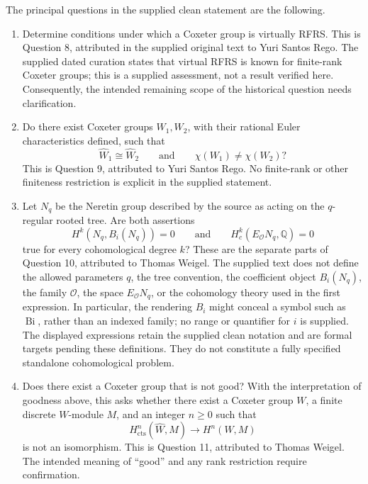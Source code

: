 \documentclass[11pt]{article}
\newcommand{\Q}{\mathbb{Q}}
\begin{document}
The principal questions in the supplied clean statement are the following.
\begin{enumerate}
\item Determine conditions under which a Coxeter group is virtually RFRS. This is Question 8, attributed in the supplied original text to Yuri Santos Rego. The supplied dated curation states that virtual RFRS is known for finite-rank Coxeter groups; this is a supplied assessment, not a result verified here. Consequently, the intended remaining scope of the historical question needs clarification.
\item Do there exist Coxeter groups \(W_1,W_2\), with their rational Euler characteristics defined, such that
\[
\widehat W_1\cong\widehat W_2
\qquad\text{and}\qquad
\chi(W_1)\neq\chi(W_2)?
\]
This is Question 9, attributed to Yuri Santos Rego. No finite-rank or other finiteness restriction is explicit in the supplied statement.
\item Let \(N_q\) be the Neretin group described by the source as acting on the \(q\)-regular rooted tree. Are both assertions
\[
H^k(N_q,B_i(N_q))=0
\qquad\text{and}\qquad
H_c^k(E_{\mathcal O}N_q,\Q)=0
\]
true for every cohomological degree \(k\)? These are the separate parts of Question 10, attributed to Thomas Weigel. The supplied text does not define the allowed parameters \(q\), the tree convention, the coefficient object \(B_i(N_q)\), the family \(\mathcal O\), the space \(E_{\mathcal O}N_q\), or the cohomology theory used in the first expression. In particular, the rendering \(B_i\) might conceal a symbol such as \(\operatorname{Bi}\), rather than an indexed family; no range or quantifier for \(i\) is supplied. The displayed expressions retain the supplied clean notation and are formal targets pending these definitions. They do not constitute a fully specified standalone cohomological problem.
\item Does there exist a Coxeter group that is not good? With the interpretation of goodness above, this asks whether there exist a Coxeter group \(W\), a finite discrete \(W\)-module \(M\), and an integer \(n\geq0\) such that
\[
H^n_{\mathrm{cts}}(\widehat W,M)\longrightarrow H^n(W,M)
\]
is not an isomorphism. This is Question 11, attributed to Thomas Weigel. The intended meaning of ``good'' and any rank restriction require confirmation.
\end{enumerate}
\end{document}
